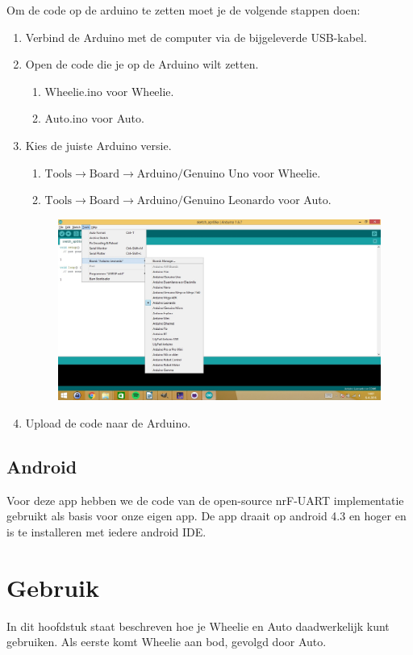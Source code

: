 \documentclass[12pt,a4paper]{article}
\begin{document}
\newpage
Om de code op de arduino te zetten moet je de volgende stappen doen:
\begin{enumerate}
	\item Verbind de Arduino met de computer via de bijgeleverde USB-kabel.
	\item Open de code die je op de Arduino wilt zetten.
		\begin{enumerate}
			\item Wheelie.ino voor Wheelie.
			\item Auto.ino voor Auto.
		\end{enumerate}
	\item Kies de juiste Arduino versie.  
	\begin{enumerate}
		\item $ \text{Tools} \rightarrow \text{Board} \rightarrow \text{Arduino/Genuino Uno} $ voor Wheelie.
		\item $ \text{Tools} \rightarrow \text{Board} \rightarrow \text{Arduino/Genuino Leonardo} $ voor Auto.
	\end{enumerate}	
	\begin{figure}[h]
		\centering
		\includegraphics[width=0.7\linewidth]{board_selecteren}
		\label{fig:board_selecteren}
	\end{figure}
	\item Upload de code naar de Arduino.		
\end{enumerate}

\subsection{Android}
Voor deze app hebben we de code van de open-source nrF-UART implementatie \cite{nrf_ua} gebruikt als basis voor onze eigen app. 
De app draait op android 4.3 en hoger en is te installeren met iedere android IDE. 

\section{Gebruik}
In dit hoofdstuk staat beschreven hoe je Wheelie en Auto daadwerkelijk kunt gebruiken. Als eerste komt Wheelie aan bod, gevolgd door Auto.
\end{document}
